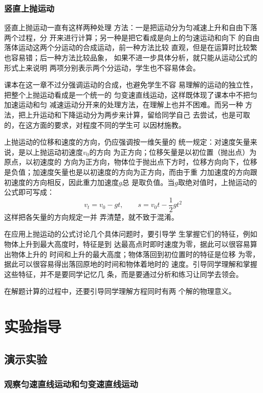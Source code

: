 \subsubsection{竖直上抛运动}

竖直上抛运动一直有这样两种处理
方法：一是把运动分为匀减速上升和自由下落两个过程，分
开来进行计算；另一种是把它看成是向上的匀速运动和向下
的自由落体运动这两个分运动的合成运动，前一种方法比较
直观，但是在运算时比较繁也容易错；后一种方法比较品象，
如果不进一步具体分析，就只能从运动公式的形式上来说明
两项分别表示两个分运动，学生也不容易体会。

课本在这一章不过分强调运动的合成，也避免学生不容
易理解的运动的独立性，把整个上抛运动看成是一个统一的
匀变速直线运动，这样既体现了课本中不把匀加速运动和匀
减速运动分开来的处理方法，在理解上也并不困难。而另一种
方法，把上升运动和下降运动分为两步来计算，留给同学自己
去尝试，也是可取的，在这方面的要求，对程度不同的学生可
以因材施教。

上抛运动的位移和速度的方向，仍应强调按一维矢量的
统一规定：对速度矢量来说，是以上抛运动初速度$v_0$的方向
为正方向；位移矢量是以初位置（抛出点）为原点，以初速度的
方向为正方向，物体位于抛出点下方时，位移方向向下，位移
是负值；加速度矢量也是以初速度的方向为正方向，而由于重
力加速度的方向跟初速度的方向相反，因此重力加速度$g$总
是取负值。当$g$取绝对值时，上抛运动的公式即可写成：
\[v_t=v_0-gt,\qquad s=v_0t-\frac{1}{2}gt^2\]
这样把各矢量的方向规定一并
弄清楚，就不致于混淆。

在应用上抛运动的公式讨论几个具体问题时，要引导学
生掌握它们的特征，例如物体上升到最大高度时，特征是到
达最高点时即时速度为零，据此可以很容易算出物体上升的
时间和上升的最大高度；物体落回到初位置时的特征是位移
为零，据此可以很容易得出落回原地的时间和物体着地时的
速度。引导同学理解和掌握这些特征，并不是要同学记忆几
条，而是要通过分析和练习让同学去领会。

在解题计算的过程中，还要引导同学理解方程同时有两
个解的物理意义。

\section{实验指导}
\subsection{演示实验}
\subsubsection{观察匀速直线运动和匀变速直线运动}

